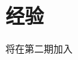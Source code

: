 \documentclass[../main.tex]{subfiles}
\begin{document}
\chapter{经验}
\vspace{-2cm}

将在第二期加入
\end{document}
